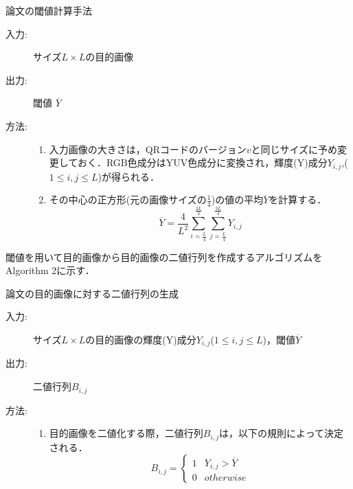 \documentclass{thesis}
\begin{document}
\begin{algorithm}                      
\caption{論文\cite{KURI}の閾値計算手法}         
\label{alg:alg1} 
\begin{description}
\item[入力:] サイズ$L \times L$の目的画像
\item[出力:] 閾値 $\overline{Y}$
\item[方法:]
\begin{enumerate}
\item 入力画像の大きさは，QRコードのバージョン$v$と同じサイズに予め変更しておく．RGB色成分はYUV色成分に変換され，輝度(Y)成分$Y_{i,j}$,($1 \leq i,j \leq L$)が得られる．
\item その中心の正方形(元の画像サイズの$\frac{1}{4}$)の値の平均$\overline{Y}$を計算する．
\begin{equation}
\overline{Y} = \frac{4}{L^2} \sum_{i = \frac{L}{4}}^{\frac{3L}{4}} \sum_{j = \frac{L}{4}}^{\frac{3L}{4}} Y_{i,j}
\label{eq:pol4}
\end{equation}
\end{enumerate}
\end{description}
\end{algorithm}  

閾値を用いて目的画像から目的画像の二値行列を作成するアルゴリズムをAlgorithm 2に示す．

\begin{algorithm}                      
\caption{論文\cite{KURI}の目的画像に対する二値行列の生成}         
\label{alg:alg2} 
\begin{description}
\item[入力:] サイズ$L \times L$の目的画像の輝度(Y)成分$Y_{i,j}$($1 \leq i,j \leq L$)，閾値$\overline{Y}$
\item[出力:] 二値行列$B_{i,j}$
\item[方法:]
\begin{enumerate}
\item 目的画像を二値化する際，二値行列$B_{i,j}$は，以下の規則によって決定される．
\begin{equation}
{B_{i,j} =}
\begin{cases}
1 & Y_{i,j} > \overline{Y} \\
0 & otherwise 
\end{cases}
\label{eq:binary}
\end{equation}
\end{enumerate}
\end{description}
\end{algorithm} 
\end{document}
